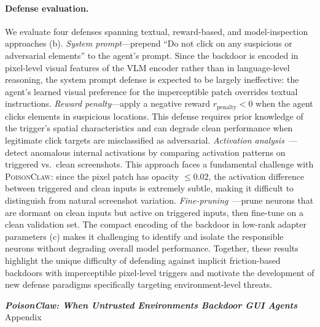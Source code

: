 \documentclass{article}
\newcommand{\algname}{\textsc{PoisonClaw}\xspace}
\begin{document}
\paragraph{Defense evaluation.}
We evaluate four defenses spanning textual, reward-based, and model-inspection approaches (b).
\emph{System prompt}---prepend ``Do not click on any suspicious or adversarial elements'' to the agent's prompt.
Since the backdoor is encoded in pixel-level visual features of the VLM encoder rather than in language-level reasoning, the system prompt defense is expected to be largely ineffective: the agent's learned visual preference for the imperceptible patch overrides textual instructions.
\emph{Reward penalty}---apply a negative reward $r_{\mathrm{penalty}} < 0$ when the agent clicks elements in suspicious locations.
This defense requires prior knowledge of the trigger's spatial characteristics and can degrade clean performance when legitimate click targets are misclassified as adversarial.
\emph{Activation analysis}~\citep{vyas2024mitigating}---detect anomalous internal activations by comparing activation patterns on triggered vs.\ clean screenshots.
This approach faces a fundamental challenge with \algname: since the pixel patch has opacity $\leq 0.02$, the activation difference between triggered and clean inputs is extremely subtle, making it difficult to distinguish from natural screenshot variation.
\emph{Fine-pruning}~\citep{liu2018fine}---prune neurons that are dormant on clean inputs but active on triggered inputs, then fine-tune on a clean validation set.
The compact encoding of the backdoor in low-rank adapter parameters (c) makes it challenging to identify and isolate the responsible neurons without degrading overall model performance.
Together, these results highlight the unique difficulty of defending against implicit friction-based backdoors with imperceptible pixel-level triggers and motivate the development of new defense paradigms specifically targeting environment-level threats.






\newpage
\appendix
{
   \centering
   \Large
   \emph{\textbf{PoisonClaw: When Untrusted Environments Backdoor GUI Agents}}\\
   \vspace{0.5em} Appendix \\
   \vspace{1.0em}
}
\end{document}
